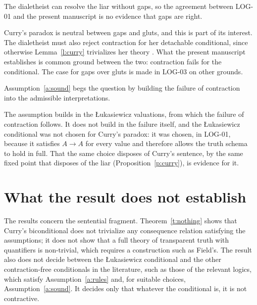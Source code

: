 \documentclass{situationist-preprint}
\begin{document}
\begin{objection}
The dialetheist can resolve the liar without gaps, so the agreement between LOG-01 and the present manuscript is no evidence that gaps are right.
\end{objection}

\begin{reply}
Curry's paradox is neutral between gaps and gluts, and this is part of its interest. The dialetheist must also reject contraction for her detachable conditional, since otherwise Lemma~\ref{l:curry} trivializes her theory \citep{Priest2006,Beall2009}. What the present manuscript establishes is common ground between the two: contraction fails for the conditional. The case for gaps over gluts is made in LOG-03 on other grounds.
\end{reply}

\begin{objection}
Assumption~\ref{a:sound} begs the question by building the failure of contraction into the admissible interpretations.
\end{objection}

\begin{reply}
The assumption builds in the Łukasiewicz valuations, from which the failure of contraction follows. It does not build in the failure itself, and the Łukasiewicz conditional was not chosen for Curry's paradox: it was chosen, in LOG-01, because it satisfies $A \to A$ for every value and therefore allows the truth schema to hold in full. That the same choice disposes of Curry's sentence, by the same fixed point that disposes of the liar (Proposition~\ref{p:curry}), is evidence for it.
\end{reply}

\section{What the result does not establish}

The results concern the sentential fragment. Theorem~\ref{t:nothing} shows that Curry's biconditional does not trivialize any consequence relation satisfying the assumptions; it does not show that a full theory of transparent truth with quantifiers is non-trivial, which requires a construction such as Field's. The result also does not decide between the Łukasiewicz conditional and the other contraction-free conditionals in the literature, such as those of the relevant logics, which satisfy Assumption~\ref{a:rules} and, for suitable choices, Assumption~\ref{a:sound}. It decides only that whatever the conditional is, it is not contractive.
\end{document}
